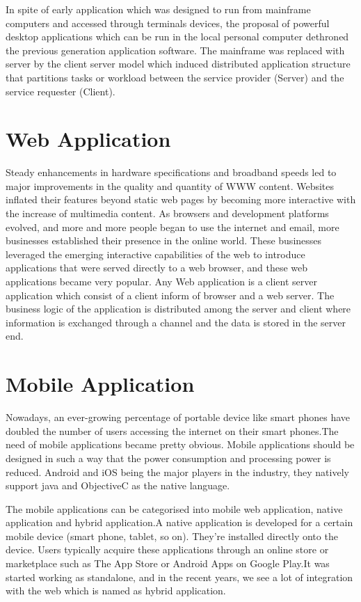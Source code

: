 			In spite of early application which was designed to run from mainframe computers and accessed through terminals devices, the proposal of powerful desktop applications which can be run in the local personal computer dethroned the previous generation application software. The mainframe was replaced with server by the client server model which induced distributed application structure that partitions tasks or workload between the service provider (Server) and the service requester (Client).  
			
\section{Web Application}
			
			Steady enhancements in hardware specifications and broadband speeds led to major improvements in the quality and quantity of WWW content. Websites inflated their features beyond static web pages by becoming more interactive with the increase of multimedia content. As browsers and development platforms evolved, and more and more people began to use the internet and email, more businesses established their presence in the online world. These businesses leveraged the emerging interactive capabilities of the web to introduce applications that were served directly to a web browser, and these web applications became very popular.
			Any Web application is a client server application which consist of a client inform of browser and a web server. The business logic of the application is distributed among the server and client where information is exchanged through a channel and the data is stored in the server end.
					 

\section{Mobile Application}
			
			Nowadays, an ever-growing percentage of portable device like smart phones have doubled the number of users accessing the internet  on their smart phones.The need of mobile applications became pretty obvious. Mobile applications should be designed in such a way that the power consumption and processing power is reduced. Android and iOS being the major players in the industry, they natively support java and ObjectiveC as the native language. 
			
			The mobile applications can be categorised into mobile web application, native application and hybrid application.A native application is developed for a certain mobile device (smart phone, tablet, so on). They’re installed directly onto the device. Users typically acquire these applications through an online store or marketplace such as The App Store or Android Apps on Google Play.It was started working as standalone, and in the recent years, we see a lot of integration with the web which is named as hybrid application.


